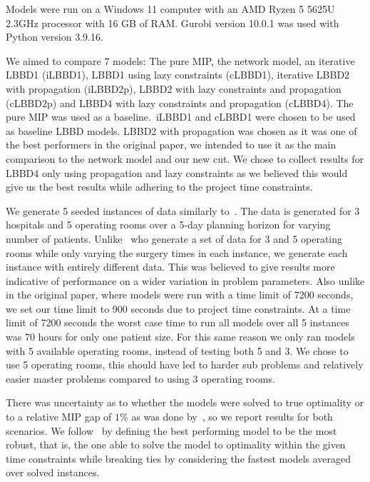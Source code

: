 Models were run on a Windows 11 computer with an AMD Ryzen 5 5625U 2.3GHz processor with 16 GB of RAM\@. Gurobi version 10.0.1 was used with Python version 3.9.16. 

We aimed to compare 7 models: The pure MIP, the network model, an iterative LBBD1 (iLBBD1), LBBD1 using lazy constraints (cLBBD1), iterative LBBD2 with propagation (iLBBD2p), LBBD2 with lazy constraints and propagation (cLBBD2p) and LBBD4 with lazy constraints and propagation (cLBBD4). The pure MIP was used as a baseline.\ iLBBD1 and cLBBD1  were chosen to be used as baseline LBBD models. LBBD2 with propagation was chosen as it was one of the best performers in the original paper, we intended to use it as the main comparison to the network model and our new cut. We chose to collect results for LBBD4 only using propagation and lazy constraints as we believed this would give us the best results while adhering to the project time constraints.

We generate 5 seeded instances of data similarly to~\cite{roshanaei2017propagating}. The data is generated for 3 hospitals and 5 operating rooms over a 5-day planning horizon for varying number of patients. Unlike~\cite{roshanaei2017propagating} who generate a set of data for 3 and 5 operating rooms while only varying the surgery times in each instance, we generate each instance with entirely different data. This was believed to give results more indicative of performance on a wider variation in problem parameters. Also unlike in the original paper, where models were run with a time limit of 7200 seconds, we set our time limit to 900 seconds due to project time constraints. At a time limit of 7200 seconds the worst case time to run all models over all 5 instances was 70 hours for only one patient size. For this same reason we only ran models with 5 available operating rooms, instead of testing both 5 and 3. We chose to use 5 operating rooms, this should have led to harder sub problems and relatively easier master problems compared to using 3 operating rooms\cite{roshanaei2017propagating}. 

There was uncertainty as to whether the models were solved to true optimality or to a relative MIP gap of $1\%$ as was done by~\cite{guo}, so we report results for both scenarios. We follow~\cite{roshanaei2017propagating} by defining the best performing model to be the most robust, that is, the one able to solve the model to optimality within the given time constraints while breaking ties by considering the fastest models averaged over solved instances.

